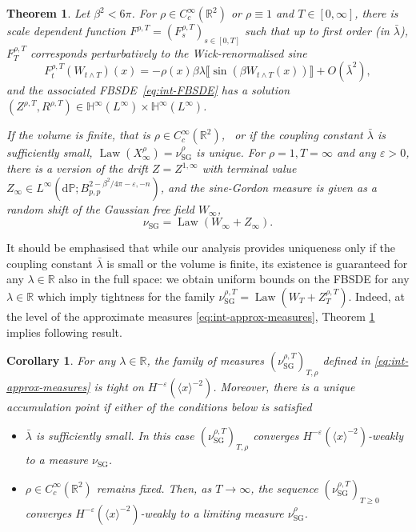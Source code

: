 \documentclass[11pt, a4paper]{scrartcl}
\numberwithin{equation}{section}
\theoremstyle{plain}
\newtheorem{theorem}[foo]{Theorem}
\newtheorem{corollary}[foo]{Corollary}
\theoremstyle{remark}
\newcommand{\mathd}{\mathrm{d}}
\newcommand{\tmop}[1]{\ensuremath{\operatorname{#1}}}
\begin{document}
\begin{theorem}
  \label{thm:int-wp}Let $\beta^2 < 6 \pi$. For $\rho \in C^{\infty}_c
  (\mathbb{R}^2)$ or $\rho \equiv 1$ and $T \in [0, \infty]$, there is scale
  dependent function $F^{\rho, T} = (F^{\rho, T}_s)_{s \in [0, T]}$ such that
  up to first order (in $\bar{\lambda}$),
  $F^{\rho, T}_T$ corresponds perturbatively to the Wick-renormalised sine
  \[ F^{\rho, T}_t (W_{t\wedge T}) (x) = - \rho (x) \beta \lambda \llbracket \sin (\beta
     W_{t\wedge T} (x)) \rrbracket + O(\bar{\lambda}^2),\]
  and the associated FBSDE~\eqref{eq:int-FBSDE} has a solution~$(Z^{\rho, T},
  R^{\rho, T}) \in \mathbb{H}^{\infty} (L^{\infty}) \times \mathbb{H}^{\infty}
  (L^{\infty})$.
  
  If the volume is finite, that is $\rho \in C^{\infty}_c (\mathbb{R}^2)$, \
  or if the coupling constant $\bar{\lambda}$ is sufficiently small, $\tmop{Law}(X_\infty^\rho)=\nu_{\tmop{SG}}^\rho$ is unique. For $\rho = 1, T = \infty$ and any $\varepsilon > 0$,
  there is a version of the drift $Z = Z^{1, \infty}$ with terminal value
  $Z_{\infty} \in L^{\infty} (\mathd \mathbb{P} ; B_{p, p}^{2 - \beta^2 / 4 \pi -
  \varepsilon, - n})$, and the sine-Gordon measure is given as a random shift
  of the Gaussian free field $W_{\infty}$,
  \[ \nu_{\tmop{SG}} = \tmop{Law} (W_{\infty} + Z_{\infty}) . \]
\end{theorem}
It should be emphasised that while our analysis provides uniqueness only if
the coupling constant $\bar{\lambda}$ is small or the volume is finite, its
existence is guaranteed for any $\lambda \in \mathbb{R}$ also in the full
space: we obtain uniform bounds on the FBSDE for any $\lambda \in \mathbb{R}$
which imply tightness for the family $\nu_{\tmop{SG}}^{\rho, T} = \tmop{Law}
(W_T + Z^{\rho, T}_T)$. Indeed, at the level of the approximate measures \eqref{eq:int-approx-measures}, Theorem \ref{thm:int-wp} implies following result.
\begin{corollary}
  For any $\lambda\in \mathbb R$, the family of measures $(\nu_{\tmop{SG}}^{\rho,T})_{T,\rho}$ defined in \eqref{eq:int-approx-measures} is tight on $H^{-\varepsilon}(\langle x\rangle^{-2})$. Moreover, there is a unique accumulation point if either of the conditions below is satisfied
  \begin{itemize}
    \item $\bar{\lambda}$ is sufficiently small. In this case $(\nu_{\tmop{SG}}^{\rho,T})_{T,\rho}$ converges $H^{-\varepsilon}(\langle x\rangle^{-2})$-weakly to a measure $\nu_{\tmop{SG}}$.
    \item $\rho\in C^\infty_c(\mathbb{R}^2)$ remains fixed. Then, as $T\to\infty$, the sequence $(\nu_{\tmop{SG}}^{\rho,T})_{T\geqslant 0}$ converges $H^{-\varepsilon}(\langle x\rangle^{-2})$-weakly to a limiting measure $\nu_{\tmop{SG}}^\rho$.
  \end{itemize}
\end{corollary}
\end{document}
